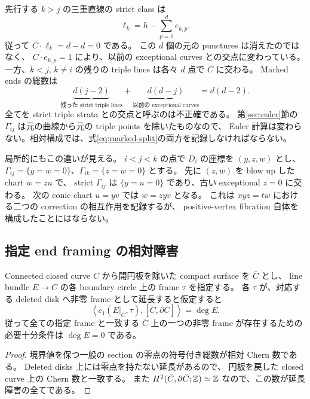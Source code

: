 先行する $k>j$ の三重直線の strict class は
\[
\ell_k=h-\sum_{p=1}^d e_{k,p}.
\]
従って $C\cdot\ell_k=d-d=0$ である。
この $d$ 個の元の punctures は消えたのではなく、
$C\cdot e_{k,p}=1$ により、以前の exceptional curves との交点に変わっている。
一方、$k<j$, $k\ne i$ の残りの triple lines は各々 $d$ 点で $C$ に交わる。
Marked ends の総数は
\begin{equation}\label{eq:marked-split}
\underbrace{d(j-2)}_{\text{残った strict triple lines}}
+
\underbrace{d(d-j)}_{\text{以前の exceptional curves}}
=d(d-2).
\end{equation}
全てを strict triple strata との交点と呼ぶのは不正確である。
第\ref{sec:euler}節の $\Gamma_{ij}^{\circ}$ は元の曲線から元の triple points を除いたものなので、
Euler 計算は変わらない。相対構成では、式\eqref{eq:marked-split}の両方を記録しなければならない。

局所的にもこの違いが見える。
$i<j<k$ の点で $D_i$ の座標を $(y,z,w)$ とし、
$\Gamma_{ij}=\{y=w=0\}$、$\Gamma_{ik}=\{z=w=0\}$ とする。
先に $(z,w)$ を blow up した chart $w=zu$ で、
strict $\Gamma_{ij}$ は $\{y=u=0\}$ であり、古い exceptional $z=0$ に交わる。
次の conic chart $u=yv$ では $w=zyv$ となる。
これは $xyz=tw$ における二つの correction の相互作用を記録するが、
positive-vertex fibration 自体を構成したことにはならない。

\subsection{指定 end framing の相対障害}

\begin{lemma}\label{lem:framing}
Connected closed curve $C$ から開円板を除いた compact surface を $\bar C$ とし、
line bundle $E\to C$ の各 boundary circle 上の frame $\tau$ を指定する。
各 $\tau$ が、対応する deleted disk へ非零 frame として延長すると仮定すると
\[
\left\langle c_1(E|_{\bar C},\tau),[\bar C,\partial\bar C]\right\rangle=\deg E.
\]
従って全ての指定 frame と一致する $\bar C$ 上の一つの非零 frame が存在するための必要十分条件は
$\deg E=0$ である。
\end{lemma}

\begin{proof}
境界値を保つ一般の section の零点の符号付き総数が相対 Chern 数である。
Deleted disks 上には零点を持たない延長があるので、
円板を戻した closed curve 上の Chern 数と一致する。
また $H^2(\bar C,\partial\bar C;\mathbb Z)\simeq\mathbb Z$ なので、この数が延長障害の全てである。
\end{proof}

